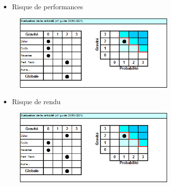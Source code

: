 \documentclass[xcolor=dvipsnames]{beamer}
\begin{document}
	
	\begin{frame}{\secname}
		\begin{itemize}
			\item Risque de performances
		\end{itemize}
		\begin{figure}
			\includegraphics[width=8cm]{risque_performance.png}
		\end{figure}
		\begin{center}
			\legendeRisque
		\end{center}
	\end{frame}	
	
	
	\begin{frame}{\secname}
		\begin{itemize}
			\item Risque de rendu
		\end{itemize}
		\begin{figure}
			\includegraphics[width=8cm]{risque_rendu.png}
		\end{figure}
		\begin{center}
			\legendeRisque
		\end{center}
	\end{frame}


\end{document}
